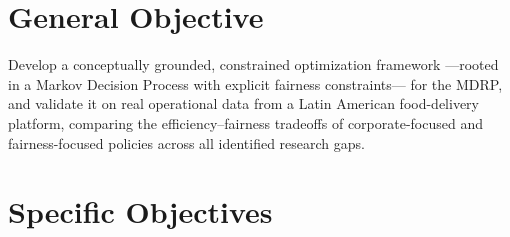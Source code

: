 \documentclass[12pt,a4paper]{report}
\begin{document}
\section{General Objective}

Develop a conceptually grounded, constrained optimization framework ---rooted in a Markov Decision Process with explicit fairness constraints--- for the MDRP, and validate it on real operational data from a Latin American food-delivery platform, comparing the efficiency--fairness tradeoffs of corporate-focused and fairness-focused policies across all identified research gaps.

\section{Specific Objectives}
\end{document}
